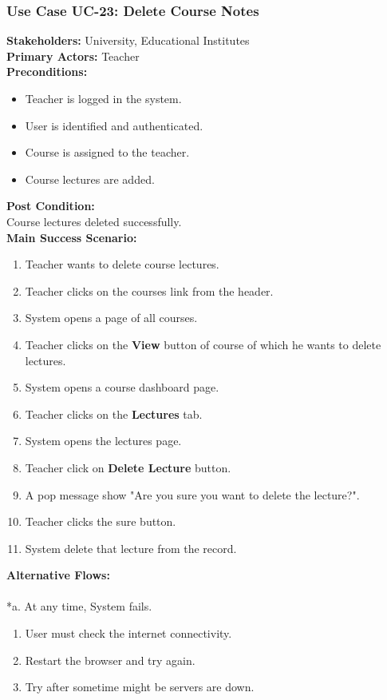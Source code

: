 \documentclass[12pt]{article}
\begin{document}
\subsubsection{Use Case UC-23: Delete Course Notes}
\textbf{Stakeholders: } University, Educational Institutes \\
\textbf{Primary Actors: }Teacher \\
\textbf{Preconditions:}
\begin{itemize}
\item Teacher is logged in the system.
\item User is identified and authenticated.
\item Course is assigned to the teacher.
\item Course lectures are added.
\end{itemize}
\textbf{Post Condition: }\\
Course lectures deleted successfully.\\
\textbf{Main Success Scenario:}
\begin{enumerate}
\item Teacher wants to delete course lectures.
\item Teacher clicks on the courses link from the header.
\item System opens a page of all courses.
\item Teacher clicks on the \textbf{View} button of course of which he wants to delete lectures.
\item System opens a course dashboard page.
\item Teacher clicks on the \textbf{Lectures} tab.
\item System opens the lectures page.
\item Teacher click on \textbf{Delete Lecture} button.
\item A pop message show "Are you sure you want to delete the lecture?".
\item Teacher clicks the sure button.
\item System delete that lecture from the record.
\end{enumerate}
\textbf{Alternative Flows:}\\
\\
*a. At any time, System fails.
\begin{enumerate}
\item User must check the internet connectivity.
\item Restart the browser and try again.
\item Try after sometime might be servers are down.
\end{enumerate}
\end{document}
